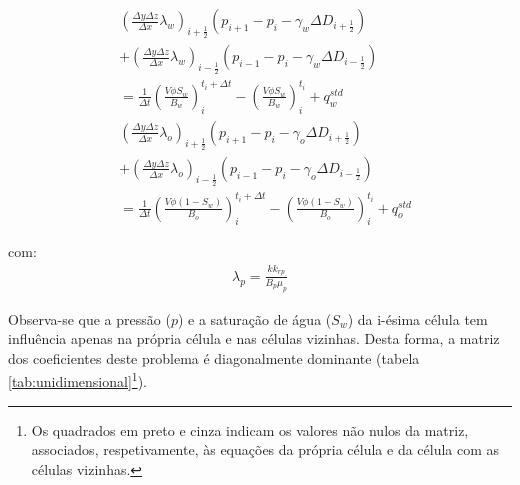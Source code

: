 \documentclass[final,5p]{elsarticle}
\numberwithin{equation}{section}
\begin{document}
        \begin{align}
            &\left( \frac{\Delta y \Delta z}{\Delta x} \lambda_w \right)_{i+\tfrac{1}{2}} (p_{i+1} - p_{i} - \gamma_w \Delta D_{i+\tfrac{1}{2}})  \nonumber \\
            &+ \left( \frac{\Delta y \Delta z}{\Delta x} \lambda_w \right)_{i-\tfrac{1}{2}} (p_{i-1} - p_{i} - \gamma_w \Delta D_{i-\tfrac{1}{2}}) \nonumber \\
            &  = \frac{1}{\Delta t} \left(\frac{V \phi S_w}{B_w}\right)_i^{t_i+\Delta t} - \left(\frac{V \phi S_w}{B_w}\right)_i^{t_i} + q^{std}_w \label{eq:blackoilumdw} \\
            &\left( \frac{\Delta y \Delta z}{\Delta x} \lambda_o \right)_{i+\tfrac{1}{2}} (p_{i+1} - p_{i} - \gamma_o \Delta D_{i+\tfrac{1}{2}})  \nonumber \\
            &+ \left( \frac{\Delta y \Delta z}{\Delta x} \lambda_o \right)_{i-\tfrac{1}{2}} (p_{i-1} - p_{i} - \gamma_o \Delta D_{i-\tfrac{1}{2}}) \nonumber \\
            &  = \frac{1}{\Delta t} \left(\frac{V \phi (1-S_w)}{B_o}\right)_i^{t_i+\Delta t} - \left(\frac{V \phi (1-S_w)}{B_o}\right)_i^{t_i} + q^{std}_o \label{eq:blackoilumdo}
        \end{align}

        \noindent com:
        \begin{align}
            \lambda_p = \frac{k k_{rp}}{B_p \mu_p} \nonumber
        \end{align}

        Observa-se que a pressão ($p$) e a saturação de água ($S_w$) da i-ésima célula tem influência apenas na própria célula e nas células vizinhas. Desta forma, a matriz dos coeficientes deste problema é diagonalmente dominante (tabela \ref{tab:unidimensional}\footnote{Os quadrados em preto e cinza indicam os valores não nulos da matriz, associados, respetivamente, às equações da própria célula e da célula com as células vizinhas.}).
\end{document}
